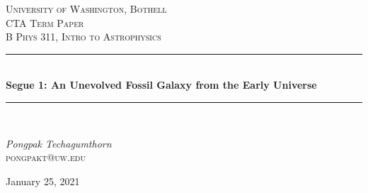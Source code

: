 \begin{titlepage} %
	\newcommand{\HRule}{\rule{\linewidth}{0.5mm}} %
	
	\center %
	
	
	\textsc{\LARGE University of Washington, Bothell}\\[1.5cm] %
	
	\textsc{\Large CTA Term Paper}\\[0.5cm] %
	
	\textsc{\large B Phys 311, Intro to Astrophysics}\\[0.5cm] %
	
	
	\HRule\\[0.4cm]
	
	{\huge\bfseries Segue 1: An Unevolved Fossil Galaxy from the Early Universe}\\[0.4cm] %
	
	\HRule\\[1.5cm]
	
	
	\begin{minipage}{0.4\textwidth}
		\begin{flushleft}
			\large
			\textit{Pongpak Techagumthorn}\\
			\textsc{pongpakt@uw.edu} %
		\end{flushleft}
	\end{minipage}
	
	
	\vfill\vfill\vfill %
	
	{\large January 25, 2021} %
	
	
	 
	
	\vfill %
	
\end{titlepage}

